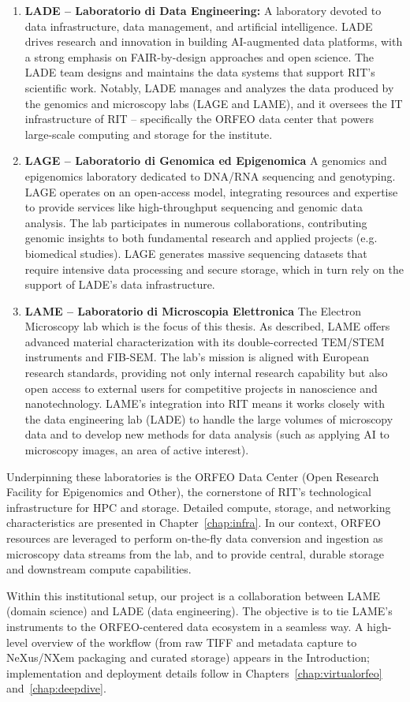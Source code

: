 \begin{enumerate}
	\item \textbf{LADE – Laboratorio di Data Engineering:}
	A laboratory devoted to data infrastructure, data management, and artificial intelligence. LADE drives research and innovation in building AI-augmented data platforms, with a strong emphasis on FAIR-by-design approaches and open science. The LADE team designs and maintains the data systems that support RIT’s scientific work. Notably, LADE manages and analyzes the data produced by the genomics and microscopy labs (LAGE and LAME), and it oversees the IT infrastructure of RIT – specifically the ORFEO data center that powers large-scale computing and storage for the institute.
	
	\item \textbf{LAGE – Laboratorio di Genomica ed Epigenomica}
	A genomics and epigenomics laboratory dedicated to DNA/RNA sequencing and genotyping. LAGE operates on an open-access model, integrating resources and expertise to provide services like high-throughput sequencing and genomic data analysis. The lab participates in numerous collaborations, contributing genomic insights to both fundamental research and applied projects (e.g. biomedical studies). LAGE generates massive sequencing datasets that require intensive data processing and secure storage, which in turn rely on the support of LADE’s data infrastructure.
	
	\item \textbf{LAME – Laboratorio di Microscopia Elettronica}
	The Electron Microscopy lab which is the focus of this thesis. As described, LAME offers advanced material characterization with its double-corrected TEM/STEM instruments and FIB-SEM. The lab’s mission is aligned with European research standards, providing not only internal research capability but also open access to external users for competitive projects in nanoscience and nanotechnology. LAME’s integration into RIT means it works closely with the data engineering lab (LADE) to handle the large volumes of microscopy data and to develop new methods for data analysis (such as applying AI to microscopy images, an area of active interest).
\end{enumerate}

\noindent Underpinning these laboratories is the ORFEO Data Center (Open Research Facility for Epigenomics and Other), the cornerstone of RIT’s technological infrastructure for HPC and storage. Detailed compute, storage, and networking characteristics are presented in Chapter~\ref{chap:infra}. In our context, ORFEO resources are leveraged to perform on-the-fly data conversion and ingestion as microscopy data streams from the lab, and to provide central, durable storage and downstream compute capabilities.

\medskip
\noindent Within this institutional setup, our project is a collaboration between LAME (domain science) and LADE (data engineering). The objective is to tie LAME’s instruments to the ORFEO-centered data ecosystem in a seamless way. A high-level overview of the workflow (from raw TIFF and metadata capture to NeXus/NXem packaging and curated storage) appears in the Introduction; implementation and deployment details follow in Chapters~\ref{chap:virtualorfeo} and~\ref{chap:deepdive}.
